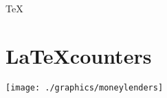 \newdef\cactus

\newdef\TeX

\newdef\org@TeX

\newdef\newdimen

\newdef\et@xglob

\newdef\@preamblecmds

\newdef\ij

\newdef\textbaht

\makeatother



\chapter{\LaTeX counters}
\clearpage

\thispagestyle{plain}
{\centering\texttt{[image: ./graphics/moneylenders]}\par}

{\centering {}\par}

